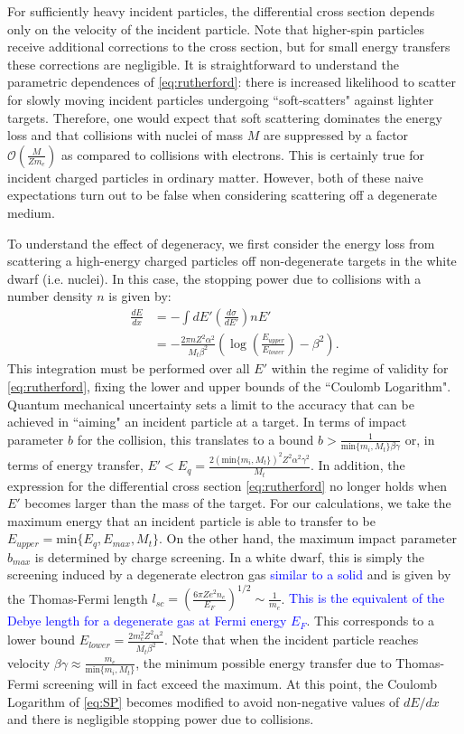 \documentclass[twocolumn,showpacs,preprintnumbers,amsmath,amssymb,prl]{revtex4}
\newcommand{\OO}{\mathcal{O}}
\def\r{\right)}
\def\l{\left(}
\begin{document}
For sufficiently heavy incident particles, the differential cross section depends only on the velocity of the incident particle. Note that higher-spin particles receive additional corrections to the cross section, but for small energy transfers these corrections are negligible. It is straightforward to understand the parametric dependences of \eqref{eq:rutherford}: there is increased likelihood to scatter for slowly moving incident particles undergoing ``soft-scatters" against lighter targets. Therefore, one would expect that soft scattering dominates the energy loss and that collisions with nuclei of mass $M$ are suppressed by a factor $\OO\l\frac{M}{Z m_e}\r$ as compared to collisions with electrons. This is certainly true for incident charged particles in ordinary matter. However, both of these naive expectations turn out to be false when considering scattering off a degenerate medium. 

To understand the effect of degeneracy, we first consider the energy loss from scattering a high-energy charged particles off non-degenerate targets in the white dwarf (i.e. nuclei). In this case, the stopping power due to collisions with a number density $n$ is given by:
\begin{align}
\label{eq:SP}
\frac{dE}{dx} & = - \int dE' \left(\frac{d \sigma}{dE'}\right) n E' \\
& = -\frac{2 \pi n Z^2 \alpha^2}{M_t \beta^2} \l \log{\l\frac{E_{upper}}{E_{lower}}\r}-\beta^2\r.
\end{align}
This integration must be performed over all $E'$ within the regime of validity for \eqref{eq:rutherford}, fixing the lower and upper bounds of the ``Coulomb Logarithm". Quantum mechanical uncertainty sets a limit to the accuracy that can be achieved in ``aiming" an incident particle at a target. In terms of impact parameter $b$ for the collision, this translates to a bound $b > \frac{1}{\text{min}\{{m_i, M_t}\} \beta \gamma}$ or, in terms of energy transfer, $E' < E_q = \frac{2 (\text{min}\{{m_i, M_t}\})^2 Z^2 \alpha^2 \gamma^2}{M_t}$. In addition, the expression for the differential cross section \eqref{eq:rutherford} no longer holds when $E'$ becomes larger than the mass of the target. For our calculations, we take the maximum energy that an incident particle is able to transfer to be $E_{upper} = \text{min}\{E_q, E_{max}, M_t\}$. On the other hand, the maximum impact parameter $b_{max}$ is determined by charge screening. In a white dwarf, this is simply the screening induced by a degenerate electron gas \textcolor{blue}{similar to a solid} and is given by the Thomas-Fermi length $l_{sc} = \l\frac{6 \pi Z e^2 n_e}{E_F}\r^{1/2}\sim \frac{1}{m_e}$. \textcolor{blue}{This is the equivalent of the Debye length for a degenerate gas at Fermi energy $E_F$}. This corresponds to a lower bound $E_{lower} = \frac{2 m_e^2 Z^2 \alpha^2}{M_t \beta^2}$. Note that when the incident particle reaches velocity $\beta \gamma \approx \frac{m_e}{\text{min}\{m_i, M_t\}}$, the minimum possible energy transfer due to Thomas-Fermi screening will in fact exceed the maximum. At this point, the Coulomb Logarithm of \eqref{eq:SP} becomes modified to avoid non-negative values of $dE/dx$ and there is negligible stopping power due to collisions. 
\end{document}
